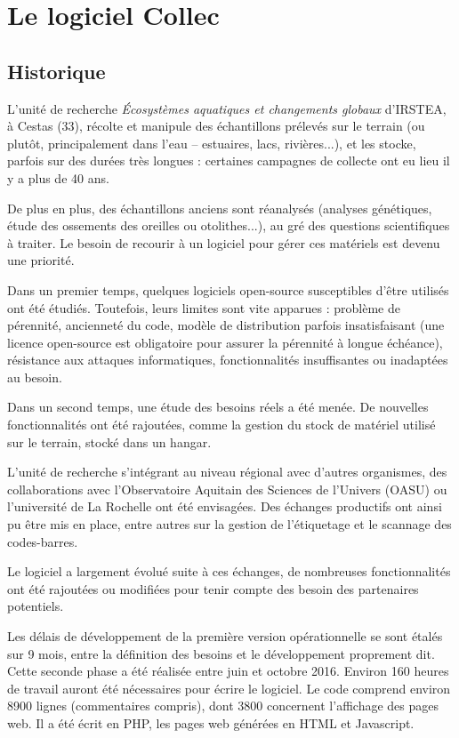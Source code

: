 \chapter{Le logiciel Collec}
\section{Historique}

L'unité de recherche \textit{Écosystèmes aquatiques et changements globaux} d'IRSTEA, à Cestas (33), récolte et manipule des échantillons prélevés sur le terrain (ou plutôt, principalement dans l'eau -- estuaires, lacs, rivières...), et les stocke, parfois sur des durées très longues : certaines campagnes de collecte ont eu lieu il y a plus de 40 ans.

De plus en plus, des échantillons anciens sont réanalysés (analyses génétiques, étude des ossements des oreilles ou otolithes...), au gré des questions scientifiques à traiter. 
Le besoin de recourir à un logiciel pour gérer ces matériels est devenu une priorité.

Dans un premier temps, quelques logiciels open-source susceptibles d'être utilisés ont été étudiés. Toutefois, leurs limites sont vite apparues : problème de pérennité, ancienneté du code, modèle de distribution parfois insatisfaisant (une licence open-source est obligatoire pour assurer la pérennité à longue échéance), résistance aux attaques informatiques, fonctionnalités insuffisantes ou inadaptées au besoin.

Dans un second temps, une étude des besoins réels a été menée. De nouvelles fonctionnalités ont été rajoutées, comme la gestion du stock de matériel utilisé sur le terrain, stocké dans un hangar.

L'unité de recherche s'intégrant au niveau régional avec d'autres organismes, des collaborations avec l'Observatoire Aquitain des Sciences de l'Univers (OASU) ou l'université de La Rochelle ont été envisagées.
Des échanges productifs ont ainsi pu être mis en place, entre autres sur la gestion de l'étiquetage et le scannage des codes-barres.

Le logiciel a largement évolué suite à ces échanges, de nombreuses fonctionnalités ont été rajoutées ou modifiées pour tenir compte des besoin des partenaires potentiels. 

Les délais de développement de la première version opérationnelle se sont étalés sur 9 mois, entre la définition des besoins et le développement proprement dit. Cette seconde phase a été réalisée entre juin et octobre 2016. Environ 160 heures de travail auront été nécessaires pour écrire le logiciel.
Le code comprend environ 8900 lignes (commentaires compris), dont 3800 concernent l'affichage des pages web. Il a été écrit en PHP, les pages web générées en HTML et Javascript.

